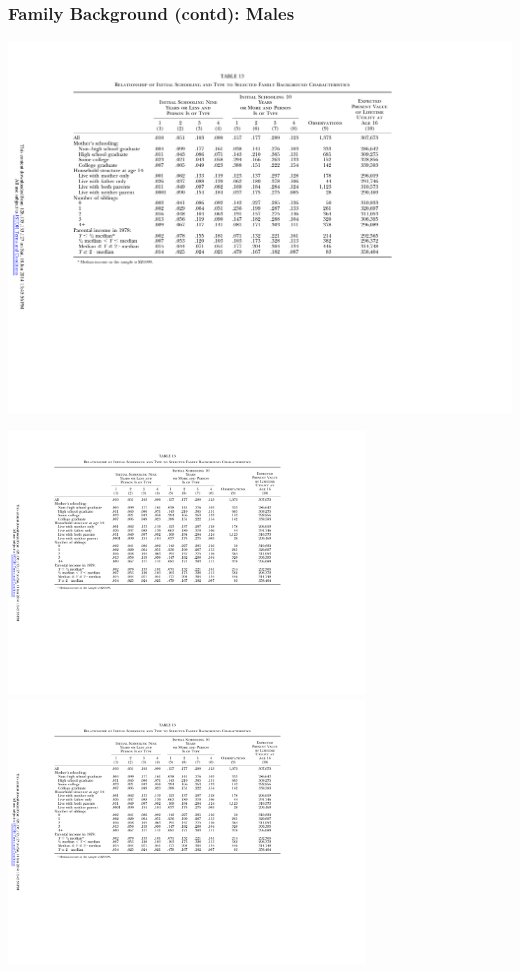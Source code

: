 \begin{frame}
	\frametitle{Family Background (contd): Males}
	\includegraphics[width=\textwidth]{tab-figs/table13_1997_header}	\\
	\begin{center}
	\includegraphics[height=2.75in]{tab-figs/table13_1997_left} \includegraphics[height=2.75in]{tab-figs/table13c_1997}	\\

\end{center}
\end{frame}
